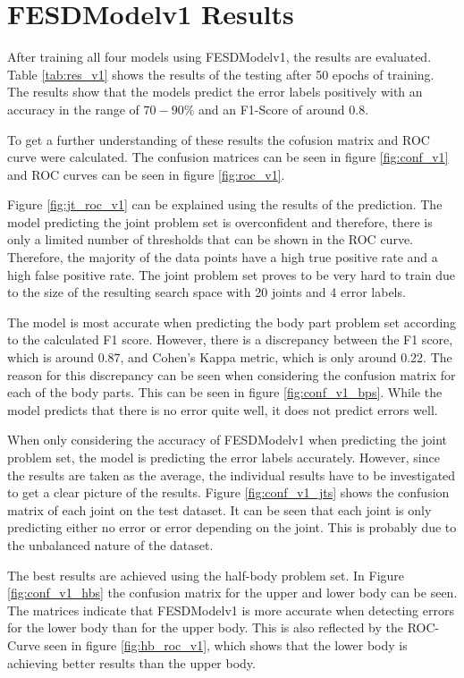 \section{FESDModelv1 Results}
\label{sec:FESDModelv1_results}

After training all four models using FESDModelv1, the results are evaluated. Table \ref{tab:res_v1} shows the results of the testing after 50 epochs of training. The results show that the models predict the error labels positively with an accuracy in the range of $70-90\%$ and an F1-Score of around 0.8.



To get a further understanding of these results the cofusion matrix and ROC curve were calculated. The confusion matrices can be seen in figure \ref{fig:conf_v1} and ROC curves can be seen in figure \ref{fig:roc_v1}.

Figure \ref{fig:jt_roc_v1} can be explained using the results of the prediction. The model predicting the joint problem set is overconfident and therefore, there is only a limited number of thresholds that can be shown in the ROC curve. Therefore, the majority of the data points have a high true positive rate and a high false positive rate. The joint problem set proves to be very hard to train due to the size of the resulting search space with 20 joints and 4 error labels.

The model is most accurate when predicting the body part problem set according to the calculated F1 score. However, there is a discrepancy between the F1 score, which is around 0.87, and Cohen's Kappa metric, which is only around 0.22. The reason for this discrepancy can be seen when considering the confusion matrix for each of the body parts. This can be seen in figure \ref{fig:conf_v1_bps}. While the model predicts that there is no error quite well, it does not predict errors well.

When only considering the accuracy of FESDModelv1 when predicting the joint problem set, the model is predicting the error labels accurately. However, since the results are taken as the average, the individual results have to be investigated to get a clear picture of the results. Figure \ref{fig:conf_v1_jts} shows the confusion matrix of each joint on the test dataset. It can be seen that each joint is only predicting either no error or error depending on the joint. This is probably due to the unbalanced nature of the dataset.

The best results are achieved using the half-body problem set. In Figure \ref{fig:conf_v1_hbs} the confusion matrix for the upper and lower body can be seen. The matrices indicate that FESDModelv1 is more accurate when detecting errors for the lower body than for the upper body. This is also reflected by the ROC-Curve seen in figure \ref{fig:hb_roc_v1}, which shows that the lower body is achieving better results than the upper body.

